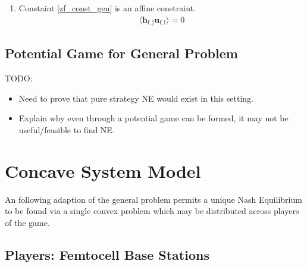\documentclass[12pt,a4paper]{report}
\begin{document}
\begin{enumerate}
\item 
	Constaint \eqref{zf_const_gen} is an affine constraint. 
		\begin{gather*}
		\langle \mathbf{h_{\mathrm{f,j}}}\mathbf{u_{\mathrm{f,i}}} \rangle =0
		\end{gather*}

\end{enumerate}

\subsection{Potential Game for General Problem}
TODO: 
\begin{itemize}
\item Need to prove that pure strategy NE would exist in this setting.
\item Explain why even through a potential game can be formed, it may not be useful/feasible to find NE. 
\end{itemize}

\section{Concave System Model}\label{conmodel}
An following adaption of the general problem permits a unique Nash Equilibrium to be found via a single convex problem which may be distributed across players of the game.
\subsection{Players: Femtocell Base Stations}
\end{document}
